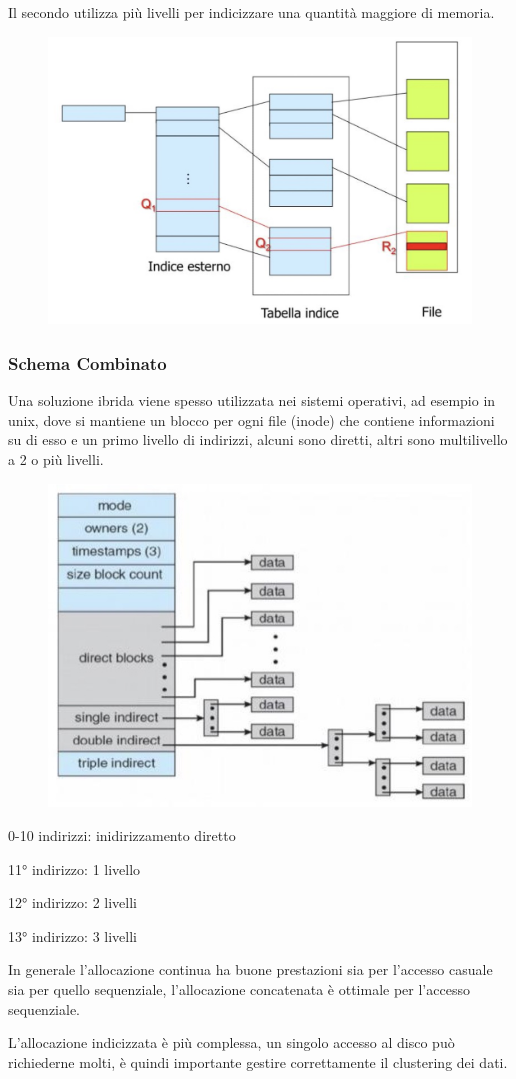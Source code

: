 \spacer
Il secondo utilizza più livelli per indicizzare una quantità maggiore di memoria.

\begin{figure}[H]
    \centering
    \includegraphics[width=0.4\linewidth]{assets/indici-multilivello.jpeg}
\end{figure}

\subsubsection{Schema Combinato}
Una soluzione ibrida viene spesso utilizzata nei sistemi operativi, ad esempio in unix, dove si mantiene un blocco per ogni file (inode) che contiene informazioni su di esso e un primo livello di indirizzi, alcuni sono diretti, altri sono multilivello a 2 o più livelli.

\begin{figure}[H]
    \centering
    \includegraphics[width=0.4\linewidth]{assets/inode-ibrido.jpeg}
\end{figure}

\begin{sitemize}
    \item 0-10 indirizzi: inidirizzamento diretto
    \item 11° indirizzo: 1 livello
    \item 12° indirizzo: 2 livelli
    \item 13° indirizzo: 3 livelli
\end{sitemize}

\begin{note}
    In generale l'allocazione continua ha buone prestazioni sia per l'accesso casuale sia per quello sequenziale, l'allocazione concatenata è ottimale per l'accesso sequenziale.

    \spacer
    L'allocazione indicizzata è più complessa, un singolo accesso al disco può richiederne molti, è quindi importante gestire correttamente il clustering dei dati.
\end{note}

